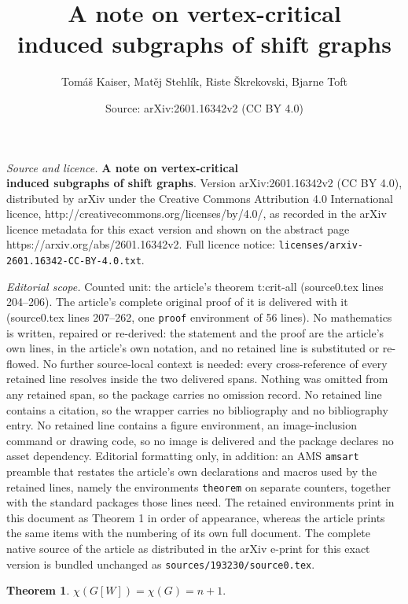 \documentclass[10pt,a4paper]{amsart}
\title{\textbf{A note on vertex-critical\\induced subgraphs of shift graphs}}
\author{Tom\'a\v{s} Kaiser, Mat\v{e}j Stehl\'ik, Riste \v{S}krekovski, Bjarne Toft}
\date{Source: arXiv:2601.16342v2 (CC BY 4.0)}
\newtheorem{theorem}{Theorem}
\begin{document}
\maketitle

\noindent\emph{Source and licence.} \textbf{A note on vertex-critical\\induced subgraphs of shift graphs}. Version arXiv:2601.16342v2 (CC BY 4.0), distributed by arXiv under the Creative Commons Attribution 4.0 International licence, http://creativecommons.org/licenses/by/4.0/, as recorded in the arXiv licence metadata for this exact version and shown on the abstract page https://arxiv.org/abs/2601.16342v2. Full licence notice: \texttt{licenses/arxiv-2601.16342-CC-BY-4.0.txt}.\par\smallskip

\noindent\textit{Editorial scope.} Counted unit: the article's theorem t:crit-all (source0.tex lines 204--206). The article's complete original proof of it is delivered with it (source0.tex lines 207--262, one \texttt{proof} environment of 56 lines). No mathematics is written, repaired or re-derived: the statement and the proof are the article's own lines, in the article's own notation, and no retained line is substituted or re-flowed.  No further source-local context is needed: every cross-reference of every retained line resolves inside the two delivered spans.  Nothing was omitted from any retained span, so the package carries no omission record.  No retained line contains a citation, so the wrapper carries no bibliography and no bibliography entry.  No retained line contains a figure environment, an image-inclusion command or drawing code, so no image is delivered and the package declares no asset dependency.  Editorial formatting only, in addition: an AMS \texttt{amsart} preamble that restates the article's own declarations and macros used by the retained lines, namely the environments \texttt{theorem} on separate counters, together with the standard packages those lines need.  The retained environments print in this document as Theorem 1 in order of appearance, whereas the article prints the same items with the numbering of its own full document.  The complete native source of the article as distributed in the arXiv e-print for this exact version is bundled unchanged as \texttt{sources/193230/source0.tex}.
\begin{theorem}\label{t:crit-all}
  $\chi(G[W]) = \chi(G) = n+1.$
\end{theorem}
\end{document}
